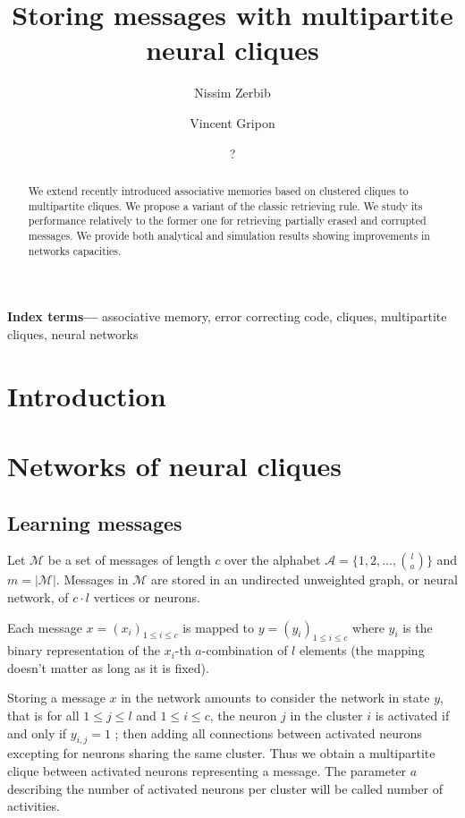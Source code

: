 \documentclass[english,11pt,twocolumn]{article}
\title{Storing messages with multipartite neural cliques}
\author[]{Nissim Zerbib}
\affil{Département d'Informatique, École normale supérieure, Paris, France}
\author[]{Vincent Gripon}
\affil{Département d'Électronique, Télécom Bretagne, Brest, France}
\author{?}
\date{
	}
\renewcommand{\le}{\leqslant}
\theoremstyle{definition}
\providecommand{\keywords}[1]{\textbf{Index terms---} #1}
\begin{document}
	\maketitle

	 \begin{abstract}
	 	We extend recently introduced associative memories based on clustered cliques to multipartite cliques. We propose a variant of the classic retrieving rule. We study its performance relatively to the former one for retrieving partially erased and corrupted messages. We provide both analytical and simulation results showing improvements in networks capacities.
	 \end{abstract}
	 
	\keywords{associative memory, error correcting code, cliques, multipartite cliques, neural networks}
	
	\section{Introduction}
	
		
	
	\section{Networks of neural cliques}
		
	\subsection{Learning messages}
		
	Let $\mathcal{M}$ be a set of messages of length $c$ over the alphabet $\mathcal{A} = \{1, 2, \hdots, {l \choose a}\}$ and $m = | \mathcal{M} |$. Messages in $\mathcal{M}$ are stored in an undirected unweighted graph, or neural network, of $c \cdot l$ vertices or neurons. 
	
	Each message $x = (x_i)_{1 \le i \le c}$ is mapped to $y = (y_i)_{1 \le i \le c}$ where $y_i$ is the binary representation of the $x_i$-th $a$-combination of $l$ elements (the mapping doesn't matter as long as it is fixed).
	
	Storing a message $x$ in the network amounts to consider the network in state $y$, that is for all $1 \le j \le l$ and $1 \le i \le c$, the neuron $j$ in the cluster $i$ is activated if and only if $y_{i,j} = 1$ ; then adding all connections between activated neurons excepting for neurons sharing the same cluster. Thus we obtain a multipartite clique between activated neurons representing a message. The parameter $a$ describing the number of activated neurons per cluster will be called number of activities.
		
\end{document}
